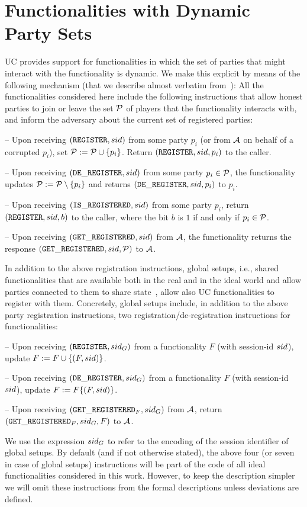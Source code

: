 \section{Functionalities with Dynamic Party Sets}\label{se:registration}
UC provides support for functionalities in which the set of parties that might interact with the functionality is dynamic. We make this explicit by means of the following mechanism (that we describe almost 
verbatim from~\cite[Sec. 3.1]{C:BMTZ17}): All the functionalities considered here include the following instructions that allow honest parties to join or leave the set $\mathcal{P}$ of players that the functionality interacts with, and inform the adversary about the current set of registered parties:
\begin{myitemize}
\item[--]  Upon receiving $(\mathtt{REGISTER}, sid)$ from some party $p_i$ (or from $\mathcal{A}$ on behalf of a corrupted $p_i$), set $\mathcal{P} := \mathcal{P} \cup \{p_i\}$. Return $(\mathtt{REGISTER}, sid, p_i)$ to the caller.

\item[--]  Upon receiving $(\mathtt{DE\_REGISTER},sid)$ from some party $p_i\in\mathcal{P}$, the functionality updates 
$\mathcal{P} :=\mathcal{P} \setminus \{p_i\}$ and returns $(\mathtt{DE\_REGISTER}, sid, p_i)$ to $p_i$.
\item[--] Upon receiving $(\mathtt{IS\_REGISTERED}, sid)$ from some party $p_i$, return $(\mathtt{REGISTER}, sid, b)$ to the caller, where the bit $b$ is $1$ if and only if $p_i\in\mathcal{P}$.
\item[--] Upon receiving $(\mathtt{GET\_REGISTERED},sid)$ from $\mathcal{A}$, the functionality returns the response 
$(\mathtt{GET\_REGISTERED}, \allowbreak sid, \mathcal{P})$ to $\mathcal{A}$.
\end{myitemize}

In addition to the above registration instructions, global setups, i.e., shared functionalities that are available both in the real and in the ideal world and allow parties connected to them to share state~\cite{TCC:CDPW07}, allow also UC functionalities to register with them. Concretely, global setups include, in addition to
 the above party registration instructions, two registration/de-registration instructions for functionalities:

\begin{myitemize}
\item[--] Upon receiving $(\mathtt{REGISTER}, sid_G)$ from a functionality $F$ (with session-id $sid$), update $F:= F \cup \{(F, sid)\}$.
\item[--] Upon receiving $(\mathtt{DE\_REGISTER},sid_G)$ from a functionality $F$ (with session-id $sid$), update $F := F \{(F, sid)\}$.
\item[--] Upon receiving $(\mathtt{GET\_REGISTERED}_F, sid_G)$ from $\mathcal{A}$, return $(\mathtt{GET\_REGISTERED}_F, sid_G, F)$ to $\mathcal{A}$.

\end{myitemize}
We use the expression $sid_G$ to refer to the encoding of the session identifier of global setups. By default (and if not otherwise stated), the above four (or seven in case of global setups) instructions will be part of the code of all ideal functionalities considered in this work. However, to keep the description simpler we will omit these instructions from the formal descriptions unless deviations are defined.
